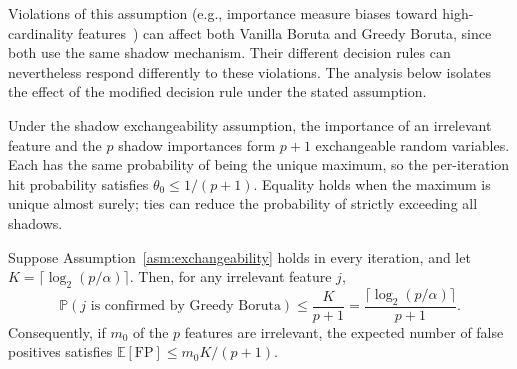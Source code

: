 \documentclass[runningheads]{llncs}
\begin{document}
Violations of this assumption (e.g., importance measure biases toward high-cardinality features~\cite{strobl2007bias,altmann2010permutation}) can affect both Vanilla Boruta and Greedy Boruta, since both use the same shadow mechanism. Their different decision rules can nevertheless respond differently to these violations. The analysis below isolates the effect of the modified decision rule under the stated assumption.

Under the shadow exchangeability assumption, the importance of an irrelevant feature and the $p$ shadow importances form $p+1$ exchangeable random variables. Each has the same probability of being the unique maximum, so the per-iteration hit probability satisfies $\theta_0 \leq 1/(p+1)$. Equality holds when the maximum is unique almost surely; ties can reduce the probability of strictly exceeding all shadows.

\begin{theorem}
\label{thm:fpr}
Suppose Assumption~\ref{asm:exchangeability} holds in every iteration, and let $K = \lceil \log_2(p/\alpha) \rceil$. Then, for any irrelevant feature $j$,
\begin{equation}
\label{eq:fpr_bound}
    \mathbb{P}(j \text{ is confirmed by Greedy Boruta}) \leq \frac{K}{p + 1} = \frac{\lceil \log_2(p/\alpha) \rceil}{p + 1}.
\end{equation}
Consequently, if $m_0$ of the $p$ features are irrelevant, the expected number of false positives satisfies $\mathbb{E}[\mathrm{FP}] \leq m_0 K/(p+1)$.
\end{theorem}
\end{document}
